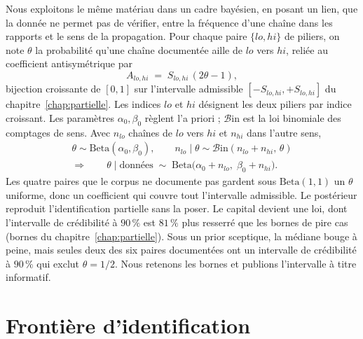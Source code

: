 Nous exploitons le même matériau dans un cadre bayésien, en posant un lien, que la donnée ne permet pas de vérifier, entre la fréquence d'une chaîne dans les rapports et le sens de la propagation. Pour chaque paire
$\{lo,hi\}$ de piliers, on note $\theta$ la probabilité qu'une chaîne documentée aille de $lo$ vers $hi$,
reliée au coefficient antisymétrique par
\[
  A_{lo,hi} \;=\; S_{lo,hi}\,(2\theta - 1),
\]
bijection croissante de $[0,1]$ sur l'intervalle admissible $[-S_{lo,hi},+S_{lo,hi}]$ du
chapitre~\ref{chap:partielle}. Les indices $lo$ et $hi$ désignent les deux piliers par indice croissant.
Les paramètres $\alpha_0,\beta_0$ règlent l'a priori ; $\mathcal{B}\mathrm{in}$ est la loi binomiale
des comptages de sens. Avec $n_{lo}$ chaînes de $lo$ vers $hi$ et $n_{hi}$ dans l'autre sens,
\begin{equation}
  \begin{gathered}
  \theta \sim \mathrm{Beta}(\alpha_0,\beta_0),
  \qquad
  n_{lo}\mid\theta \sim \mathcal{B}\mathrm{in}(n_{lo}+n_{hi},\,\theta)
  \\
  \Longrightarrow\qquad
  \theta \mid \text{données} \;\sim\; \mathrm{Beta}\bigl(\alpha_0+n_{lo},\;\beta_0+n_{hi}\bigr).
  \end{gathered}
  \label{eq:posterieur-beta}
\end{equation}
Les quatre paires que le corpus ne documente pas gardent sous $\mathrm{Beta}(1,1)$ un $\theta$
uniforme, donc un coefficient qui couvre tout l'intervalle admissible. Le postérieur reproduit
l'identification partielle sans la poser. Le capital devient une loi, dont l'intervalle de
crédibilité à $90\,\%$ est $81\,\%$ plus resserré que les bornes de pire cas
(bornes du chapitre~\ref{chap:partielle}). Sous un prior sceptique, la médiane bouge à peine, mais seules deux des six
paires documentées ont un intervalle de crédibilité à $90\,\%$ qui exclut $\theta=1/2$. Nous retenons les bornes et publions l'intervalle à titre informatif.

\section{Frontière d'identification}

